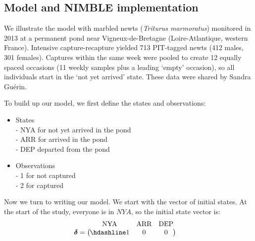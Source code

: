 \documentclass[
  12pt,
]{krantz}
\begin{document}
\subsection{Model and NIMBLE implementation}\label{model-and-nimble-implementation-8}

We illustrate the model with marbled newts (\emph{Triturus marmoratus}) monitored in 2013 at a permanent pond near Vigneux-de-Bretagne (Loire-Atlantique, western France). Intensive capture-recapture yielded 713 PIT-tagged newts (412 males, 301 females). Captures within the same week were pooled to create 12 equally spaced occasions (11 weekly samples plus a leading `empty' occasion), so all individuals start in the `not yet arrived' state. These data were shared by Sandra Guérin.

To build up our model, we first define the states and observations:

\begin{itemize}
\item
  States\\
  - NYA for not yet arrived in the pond\\
  - ARR for arrived in the pond\\
  - DEP departed from the pond
\item
  Observations\\
  - 1 for not captured\\
  - 2 for captured
\end{itemize}

Now we turn to writing our model. We start with the vector of initial states. At the start of the study, everyone is in \(NYA\), so the initial state vector is:
\[
\begin{matrix}
& \\
\boldsymbol{\delta} =
\left ( \vphantom{ \begin{matrix} 1 \end{matrix} } \right .
\end{matrix}
\hspace{-1.2em}
\begin{matrix}
\text{NYA} & \text{ARR} & \text{DEP} \\ \hdashline
1 & 0 & 0
\end{matrix}
\hspace{-0.2em}
\begin{matrix}
& \\
\left . \vphantom{ \begin{matrix} 1 \end{matrix} } \right )
\end{matrix}
\]
\end{document}
